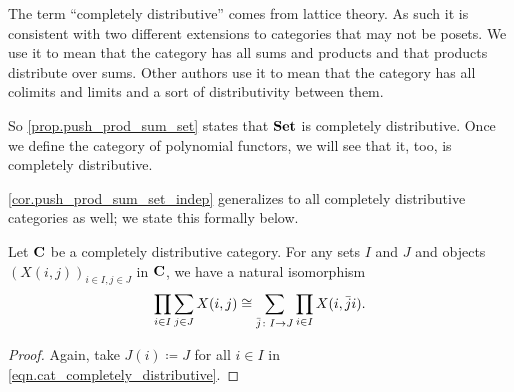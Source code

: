 \documentclass[Book-Poly]{subfiles}
\begin{document}
The term ``completely distributive'' comes from lattice theory. As such it is consistent with two different extensions to categories that may not be posets. We use it to mean that the category has all sums and products and that products distribute over sums. Other authors use it to mean that the category has all colimits and limits and a sort of distributivity between them.

So \cref{prop.push_prod_sum_set} states that $\mathbf{Set}$ is completely distributive.
Once we define the category of polynomial functors, we will see that it, too, is completely distributive.



\cref{cor.push_prod_sum_set_indep} generalizes to all completely distributive categories as well; we state this formally below.

\begin{corollary} \label{cor.push_prod_sum_obj_indep}
    Let $\mathbf{C}$ be a completely distributive category.
    For any sets $I$ and $J$ and objects $(X(i, j))_{i \in I, j \in J}$ in $\mathbf{C}$, we have a natural isomorphism
    \begin{equation} \label{eqn.push_prod_sum_obj_indep}
        \prod_{i\in I}\sum_{j\in J}X(i,j)\cong\sum_{\bar{j}\colon I\to J}\prod_{i\in I}X(i,\bar{j}i).
    \end{equation}
\end{corollary}
\begin{proof}
    Again, take $J(i)\coloneqq J$ for all $i \in I$ in \eqref{eqn.cat_completely_distributive}.
\end{proof}

\end{document}
